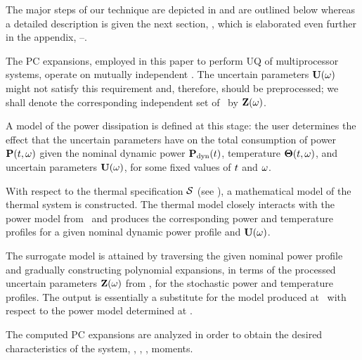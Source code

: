 The major steps of our technique are depicted in  and are outlined below whereas a detailed description is given the next section, , which is elaborated even further in the appendix, --.

 The PC expansions, employed in this paper to perform UQ of multiprocessor systems, operate on mutually independent \rvs. The uncertain parameters $\mathbf{U}(\omega)$ might not satisfy this requirement and, therefore, should be preprocessed; we shall denote the corresponding independent set of \rvs\ by $\mathbf{Z}(\omega)$.

 A model of the power dissipation is defined at this stage: the user determines the effect that the uncertain parameters have on the total consumption of power $\mathbf{P}(t, \omega)$ given the nominal dynamic power $\mathbf{P}_{\text{dyn}}(t)$, temperature ${\boldsymbol\Theta}(t, \omega)$, and uncertain parameters $\mathbf{U}(\omega)$, for some fixed values of $t$ and $\omega$.

 With respect to the thermal specification $\mathcal{S}$ (see ), a mathematical model of the thermal system is constructed. The thermal model closely interacts with the power model from \ and produces the corresponding power and temperature profiles for a given nominal dynamic power profile and $\mathbf{U}(\omega)$.

 The surrogate model is attained by traversing the given nominal power profile and gradually constructing polynomial expansions, in terms of the processed uncertain parameters $\mathbf{Z}(\omega)$ from , for the stochastic power and temperature profiles. The output is essentially a substitute for the model produced at \ with respect to the power model determined at .

 The computed PC expansions are analyzed in order to obtain the desired characteristics of the system, \eg, \cdfs, \pdfs, moments.
